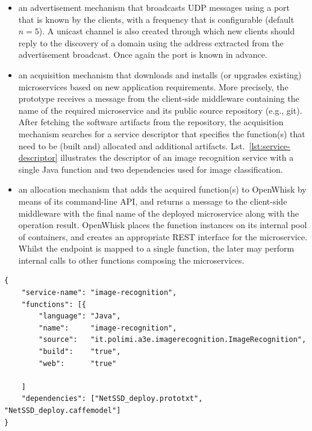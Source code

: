 \begin{itemize}

	\item an advertisement mechanism that broadcasts UDP messages using a port that is known by the clients, with a frequency that is configurable (default $n=5$). A unicast channel is also created through which new clients should reply to the discovery of a domain using the address extracted from the advertisement broadcast. Once again the port is known in advance.

	\item an acquisition mechanism that downloads and installs (or upgrades existing) microservices based on new application requirements. More precisely, the prototype receives a message from the client-side middleware containing the name of the required microservice and its public source repository (e.g., git). After fetching the software artifacts from the repository, the acquisition mechanism searches for a service descriptor that specifies the function(s) that need to be (built and) allocated and additional artifacts. Lst.~\ref{lst:service-descriptor} illustrates the descriptor of an image recognition service with a single Java function and two dependencies used for image classification.

	\item an allocation mechanism that adds the acquired function(s) to OpenWhisk by means of its command-line API, and returns a message to the client-side middleware with the final name of the deployed microservice along with the operation result. OpenWhisk places the function instances on its internal pool of containers, and creates an appropriate REST interface for the microservice. Whilst the endpoint is mapped to a single function, the later may perform internal calls to other functions composing the microservices.

\end{itemize}



\begin{minipage}{\linewidth}
\begin{lstlisting}[caption=Image recognition service descriptor, label=lst:service-descriptor, captionpos=t]
{
	"service-name":	"image-recognition",
	"functions": [{	
		"language":	"Java",
		"name":		"image-recognition",
		"source":	"it.polimi.a3e.imagerecognition.ImageRecognition",
		"build":	"true",
		"web":		"true"
		
	]
	"dependencies": ["NetSSD_deploy.prototxt", "NetSSD_deploy.caffemodel"]
}
\end{lstlisting}
\end{minipage}

